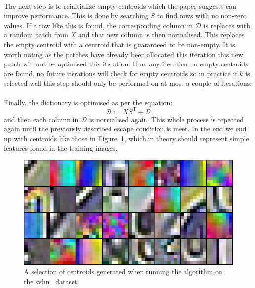 \documentclass{article}
\begin{document}
\paragraph*{}

The next step is to reinitialize empty centroids which the paper suggests can improve performance. This is done by searching $S$ to find rows with no non-zero values. If a row like this is found, the corresponding column in $\mathcal{D}$ is replaces with a random patch from $X$ and that new column is then normalised. This replaces the empty centroid with a centroid that is guaranteed to be non-empty. It is worth noting as the patches have already been allocated this iteration this new patch will not be optimised this iteration. If on any iteration no empty centroids are found, no future iterations will check for empty centroids so in practice if $k$ is selected well this step should only be performed on at most a couple of iterations.

\paragraph*{}

Finally, the dictionary is optimised as per the equation:
\[
\mathcal{D} := XS^{\mathrm{T}} + \mathcal{D}
\]
and then each column in $\mathcal{D}$ is normalised again. This whole process is repeated again until the previously described escape condition is meet. In the end we end up with centroids like those in Figure~\ref{centroids}, which in theory should represent simple features found in the training images.

\begin{figure}[h]
\includegraphics[width=\linewidth]{centroids.png}
\caption{A selection of centroids generated when running the algorithm on the svhn~\cite{svhn} dataset.}
\label{centroids}
\end{figure}
\end{document}
